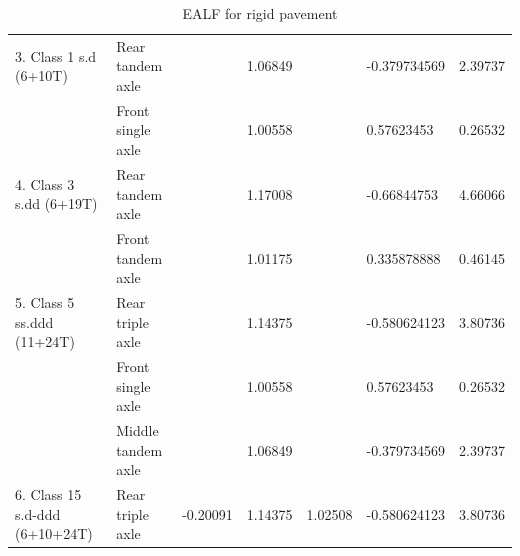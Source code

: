 \begin{table}[H]
{\begin{tabular}{|llclcl
>{\columncolor[HTML]{C0E6F5}}c |}
\multicolumn{1}{|l|}{\multirow{-2}{*}{3. Class 1 s.d (6+10T)}}           & \multicolumn{1}{l|}{Rear tandem axle}      & \multicolumn{1}{c|}{}                            & \multicolumn{1}{l|}{1.06849}          & \multicolumn{1}{c|}{}                           & \multicolumn{1}{l|}{-0.379734569}         & 2.39737       \\ \cline{1-2} \cline{4-4} \cline{6-7}
\multicolumn{1}{|l|}{}                                                   & \multicolumn{1}{l|}{Front single axle}     & \multicolumn{1}{c|}{}                            & \multicolumn{1}{l|}{1.00558}          & \multicolumn{1}{c|}{}                           & \multicolumn{1}{l|}{0.57623453}           & 0.26532       \\ \cline{2-2} \cline{4-4} \cline{6-7}
\multicolumn{1}{|l|}{\multirow{-2}{*}{4. Class 3 s.dd (6+19T)}}          & \multicolumn{1}{l|}{Rear tandem axle}      & \multicolumn{1}{c|}{}                            & \multicolumn{1}{l|}{1.17008}          & \multicolumn{1}{c|}{}                           & \multicolumn{1}{l|}{-0.66844753}          & 4.66066       \\ \cline{1-2} \cline{4-4} \cline{6-7}
\multicolumn{1}{|l|}{}                                                   & \multicolumn{1}{l|}{Front tandem axle}     & \multicolumn{1}{c|}{}                            & \multicolumn{1}{l|}{1.01175}          & \multicolumn{1}{c|}{}                           & \multicolumn{1}{l|}{0.335878888}          & 0.46145       \\ \cline{2-2} \cline{4-4} \cline{6-7}
\multicolumn{1}{|l|}{\multirow{-2}{*}{5. Class 5 ss.ddd (11+24T)}}       & \multicolumn{1}{l|}{Rear triple axle}      & \multicolumn{1}{c|}{}                            & \multicolumn{1}{l|}{1.14375}          & \multicolumn{1}{c|}{}                           & \multicolumn{1}{l|}{-0.580624123}         & 3.80736       \\ \cline{1-2} \cline{4-4} \cline{6-7}
\multicolumn{1}{|l|}{}                                                   & \multicolumn{1}{l|}{Front single axle}     & \multicolumn{1}{c|}{}                            & \multicolumn{1}{l|}{1.00558}          & \multicolumn{1}{c|}{}                           & \multicolumn{1}{l|}{0.57623453}           & 0.26532       \\ \cline{2-2} \cline{4-4} \cline{6-7}
\multicolumn{1}{|l|}{}                                                   & \multicolumn{1}{l|}{Middle tandem axle}    & \multicolumn{1}{c|}{}                            & \multicolumn{1}{l|}{1.06849}          & \multicolumn{1}{c|}{}                           & \multicolumn{1}{l|}{-0.379734569}         & 2.39737       \\ \cline{2-2} \cline{4-4} \cline{6-7}
\multicolumn{1}{|l|}{\multirow{-3}{*}{6. Class 15 s.d-ddd (6+10+24T)}}   & \multicolumn{1}{l|}{Rear triple axle}      & \multicolumn{1}{c|}{\multirow{-13}{*}{-0.20091}} & \multicolumn{1}{l|}{1.14375}          & \multicolumn{1}{c|}{\multirow{-13}{*}{1.02508}} & \multicolumn{1}{l|}{-0.580624123}         & 3.80736       \\ \hline
\end{tabular}}
\caption{EALF for rigid pavement}
\label{tab:ealf_rigid}
\end{table}
